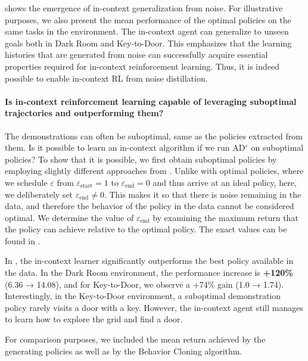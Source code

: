 \documentclass{article}
\theoremstyle{plain}
\theoremstyle{definition}
\theoremstyle{remark}
\begin{document}
 shows the emergence of in-context generalization from noise. For illustrative purposes, we also present the mean performance of the optimal policies on the same tasks in the environment. The in-context agent can generalize to unseen goals both in Dark Room and Key-to-Door. This emphasizes that the learning histories that are generated from noise can successfully acquire essential properties required for in-context reinforcement learning. Thus, it is indeed possible to enable in-context RL from noise distillation.

\paragraph{Is in-context reinforcement learning capable of leveraging suboptimal trajectories and outperforming them?}
The demonstrations can often be suboptimal, same as the policies extracted from them. Is it possible to learn an in-context algorithm if we run AD$^\varepsilon$ on suboptimal policies? To show that it is possible, we first obtain suboptimal policies by employing slightly different approaches from . Unlike with optimal policies, where we schedule $\varepsilon$ from $\varepsilon_\textrm{start} = 1$ to $\varepsilon_\textrm{end} = 0$ and thus arrive at an ideal policy, here, we deliberately set $\varepsilon_\textrm{end} \neq 0$. This makes it so that there is noise remaining in the data, and therefore the behavior of the policy in the data cannot be considered optimal. We determine the value of $\varepsilon_\textrm{end}$ by examining the maximum return that the policy can achieve relative to the optimal policy. The exact values can be found in .

In , the in-context learner significantly outperforms the best policy available in the data. In the Dark Room environment, the performance increase is \textbf{+120\%} (6.36 → 14.08), and for Key-to-Door, we observe a +74\% gain (1.0 → 1.74). Interestingly, in the Key-to-Door environment, a suboptimal demonstration policy rarely visits a door with a key. However, the in-context agent still manages to learn how to explore the grid and find a door. 

For comparison purposes, we included the mean return achieved by the generating policies as well as by the Behavior Cloning algorithm.
\end{document}
